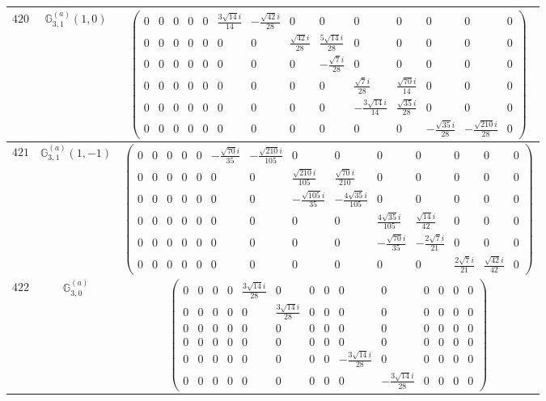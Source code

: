 \documentclass[fleqn,8pt,landscape]{jsarticle}
\begin{document}
\begin{center}
\begin{longtable}{ccc}
$ 420 $ & $ \mathbb{G}_{3,1}^{(a)}(1,0) $ & $ \begin{pmatrix} 0 & 0 & 0 & 0 & 0 & \frac{3 \sqrt{14} i}{14} & - \frac{\sqrt{42} i}{28} & 0 & 0 & 0 & 0 & 0 & 0 & 0 \\ 0 & 0 & 0 & 0 & 0 & 0 & 0 & \frac{\sqrt{42} i}{28} & \frac{5 \sqrt{14} i}{28} & 0 & 0 & 0 & 0 & 0 \\ 0 & 0 & 0 & 0 & 0 & 0 & 0 & 0 & - \frac{\sqrt{7} i}{28} & 0 & 0 & 0 & 0 & 0 \\ 0 & 0 & 0 & 0 & 0 & 0 & 0 & 0 & 0 & \frac{\sqrt{7} i}{28} & \frac{\sqrt{70} i}{14} & 0 & 0 & 0 \\ 0 & 0 & 0 & 0 & 0 & 0 & 0 & 0 & 0 & - \frac{3 \sqrt{14} i}{14} & \frac{\sqrt{35} i}{28} & 0 & 0 & 0 \\ 0 & 0 & 0 & 0 & 0 & 0 & 0 & 0 & 0 & 0 & 0 & - \frac{\sqrt{35} i}{28} & - \frac{\sqrt{210} i}{28} & 0 \end{pmatrix} $ \\ \hline
$ 421 $ & $ \mathbb{G}_{3,1}^{(a)}(1,-1) $ & $ \begin{pmatrix} 0 & 0 & 0 & 0 & 0 & - \frac{\sqrt{70} i}{35} & - \frac{\sqrt{210} i}{105} & 0 & 0 & 0 & 0 & 0 & 0 & 0 \\ 0 & 0 & 0 & 0 & 0 & 0 & 0 & \frac{\sqrt{210} i}{105} & \frac{\sqrt{70} i}{210} & 0 & 0 & 0 & 0 & 0 \\ 0 & 0 & 0 & 0 & 0 & 0 & 0 & - \frac{\sqrt{105} i}{35} & - \frac{4 \sqrt{35} i}{105} & 0 & 0 & 0 & 0 & 0 \\ 0 & 0 & 0 & 0 & 0 & 0 & 0 & 0 & 0 & \frac{4 \sqrt{35} i}{105} & \frac{\sqrt{14} i}{42} & 0 & 0 & 0 \\ 0 & 0 & 0 & 0 & 0 & 0 & 0 & 0 & 0 & - \frac{\sqrt{70} i}{35} & - \frac{2 \sqrt{7} i}{21} & 0 & 0 & 0 \\ 0 & 0 & 0 & 0 & 0 & 0 & 0 & 0 & 0 & 0 & 0 & \frac{2 \sqrt{7} i}{21} & \frac{\sqrt{42} i}{42} & 0 \end{pmatrix} $ \\ \hline
$ 422 $ & $ \mathbb{G}_{3,0}^{(a)} $ & $ \begin{pmatrix} 0 & 0 & 0 & 0 & \frac{3 \sqrt{14} i}{28} & 0 & 0 & 0 & 0 & 0 & 0 & 0 & 0 & 0 \\ 0 & 0 & 0 & 0 & 0 & \frac{3 \sqrt{14} i}{28} & 0 & 0 & 0 & 0 & 0 & 0 & 0 & 0 \\ 0 & 0 & 0 & 0 & 0 & 0 & 0 & 0 & 0 & 0 & 0 & 0 & 0 & 0 \\ 0 & 0 & 0 & 0 & 0 & 0 & 0 & 0 & 0 & 0 & 0 & 0 & 0 & 0 \\ 0 & 0 & 0 & 0 & 0 & 0 & 0 & 0 & - \frac{3 \sqrt{14} i}{28} & 0 & 0 & 0 & 0 & 0 \\ 0 & 0 & 0 & 0 & 0 & 0 & 0 & 0 & 0 & - \frac{3 \sqrt{14} i}{28} & 0 & 0 & 0 & 0 \end{pmatrix} $ \\ \hline

\end{longtable}
\end{center}
\end{document}
